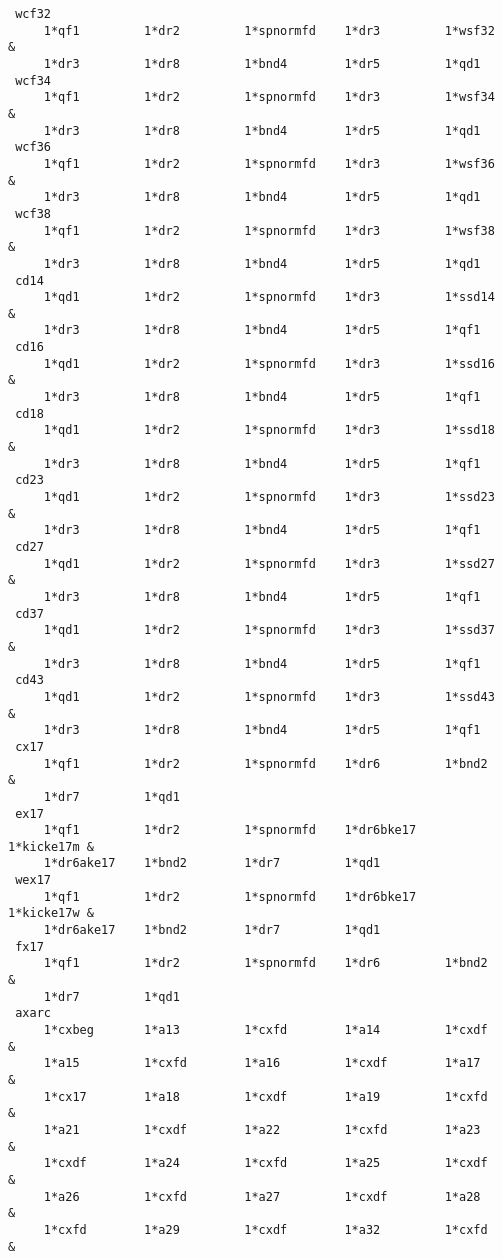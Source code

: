 \begin{footnotesize}
\begin{verbatim}
 wcf32
     1*qf1         1*dr2         1*spnormfd    1*dr3         1*wsf32    &
     1*dr3         1*dr8         1*bnd4        1*dr5         1*qd1
 wcf34
     1*qf1         1*dr2         1*spnormfd    1*dr3         1*wsf34    &
     1*dr3         1*dr8         1*bnd4        1*dr5         1*qd1
 wcf36
     1*qf1         1*dr2         1*spnormfd    1*dr3         1*wsf36    &
     1*dr3         1*dr8         1*bnd4        1*dr5         1*qd1
 wcf38
     1*qf1         1*dr2         1*spnormfd    1*dr3         1*wsf38    &
     1*dr3         1*dr8         1*bnd4        1*dr5         1*qd1
 cd14
     1*qd1         1*dr2         1*spnormfd    1*dr3         1*ssd14    &
     1*dr3         1*dr8         1*bnd4        1*dr5         1*qf1
 cd16
     1*qd1         1*dr2         1*spnormfd    1*dr3         1*ssd16    &
     1*dr3         1*dr8         1*bnd4        1*dr5         1*qf1
 cd18
     1*qd1         1*dr2         1*spnormfd    1*dr3         1*ssd18    &
     1*dr3         1*dr8         1*bnd4        1*dr5         1*qf1
 cd23
     1*qd1         1*dr2         1*spnormfd    1*dr3         1*ssd23    &
     1*dr3         1*dr8         1*bnd4        1*dr5         1*qf1
 cd27
     1*qd1         1*dr2         1*spnormfd    1*dr3         1*ssd27    &
     1*dr3         1*dr8         1*bnd4        1*dr5         1*qf1
 cd37
     1*qd1         1*dr2         1*spnormfd    1*dr3         1*ssd37    &
     1*dr3         1*dr8         1*bnd4        1*dr5         1*qf1
 cd43
     1*qd1         1*dr2         1*spnormfd    1*dr3         1*ssd43    &
     1*dr3         1*dr8         1*bnd4        1*dr5         1*qf1
 cx17
     1*qf1         1*dr2         1*spnormfd    1*dr6         1*bnd2     &
     1*dr7         1*qd1
 ex17
     1*qf1         1*dr2         1*spnormfd    1*dr6bke17    1*kicke17m &
     1*dr6ake17    1*bnd2        1*dr7         1*qd1
 wex17
     1*qf1         1*dr2         1*spnormfd    1*dr6bke17    1*kicke17w &
     1*dr6ake17    1*bnd2        1*dr7         1*qd1
 fx17
     1*qf1         1*dr2         1*spnormfd    1*dr6         1*bnd2     &
     1*dr7         1*qd1
 axarc
     1*cxbeg       1*a13         1*cxfd        1*a14         1*cxdf     &
     1*a15         1*cxfd        1*a16         1*cxdf        1*a17      &
     1*cx17        1*a18         1*cxdf        1*a19         1*cxfd     &
     1*a21         1*cxdf        1*a22         1*cxfd        1*a23      &
     1*cxdf        1*a24         1*cxfd        1*a25         1*cxdf     &
     1*a26         1*cxfd        1*a27         1*cxdf        1*a28      &
     1*cxfd        1*a29         1*cxdf        1*a32         1*cxfd     &

\end{verbatim}
\end{footnotesize}
